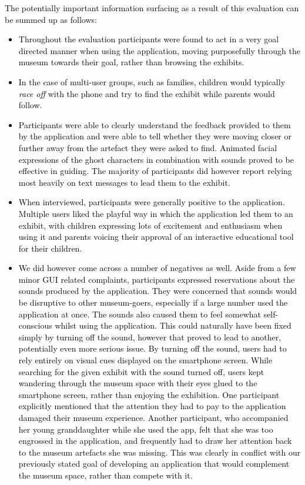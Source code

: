 \documentclass[prodmode,acmtomm]{acmsmall}
\begin{document}
\textcolor{black}{
The potentially important information surfacing as a result of this evaluation can be summed up as follows:
\begin{itemize}
\item Throughout the evaluation participants were found to act in a very goal directed manner when using the application, moving purposefully through the museum towards their goal, rather than browsing the exhibits. 
\item In the case of multi-user groups, such as families, children would typically \textit{race off} with the phone and try to find the exhibit while parents would follow.
\item Participants were able to clearly understand the feedback provided to them by the application and were able to tell whether they were moving closer or further away from the artefact they were asked to find. Animated facial expressions of the ghost characters in combination with sounds proved to be effective in guiding. The majority of participants did however report relying most heavily on text messages to lead them to the exhibit. 
\item When interviewed, participants were generally positive to the application. Multiple users liked the playful way in which the application led them to an exhibit, with children expressing lots of excitement and enthusiasm when using it and parents voicing their approval of an interactive educational tool for their children. 
\item We did however come across a number of negatives as well. Aside from a few minor GUI related complaints, participants expressed reservations about the sounds produced by the application. They were concerned that sounds would be disruptive to other museum-goers, especially if a large number used the application at once. The sounds also caused them to feel somewhat self-conscious whilst using the application. This could naturally have been fixed simply by turning off the sound, however that proved to lead to another, potentially even more serious issue. By turning off the sound, users had to rely entirely on visual cues displayed on the smartphone screen. While searching for the given exhibit with the sound turned off, users kept wandering through the museum space with their eyes glued to the smartphone screen, rather than enjoying the exhibition. One participant explicitly mentioned that the attention they had to pay to the application damaged their museum experience. Another participant, who accompanied her young granddaughter while she used the app, felt that she was too engrossed in the application, and frequently had to draw her attention back to the museum artefacts she was missing. This was clearly in conflict with our previously stated goal of developing an application that would complement the museum space, rather than compete with it.
\end{itemize}
}
 
\end{document}
